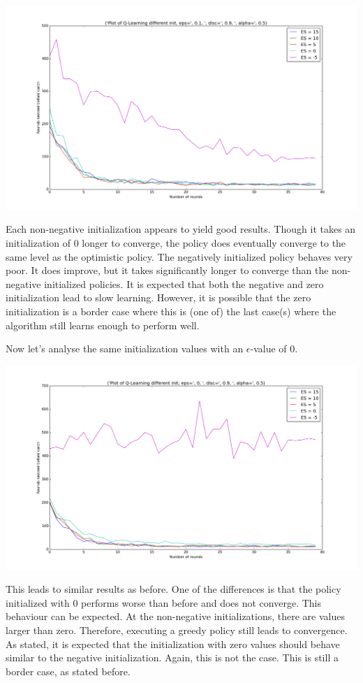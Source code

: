 \documentclass{article}
\begin{document}
\begin{center}
	\includegraphics[scale=0.4]{q_learnin_diff_init_epsilon_0_1}
\end{center}

Each non-negative initialization appears to yield good results. Though it takes an initialization of 0 longer to converge, the policy does eventually converge to the same level as the optimistic policy. The negatively initialized policy behaves very poor. It does improve, but it takes significantly longer to converge than the non-negative initialized policies. It is expected that both the negative and zero initialization lead to slow learning. However, it is possible that the zero initialization is a border case where this is (one of) the last case(s) where the algorithm still learns enough to perform well.

Now let's analyse the same initialization values with an $\epsilon$-value of 0.
\begin{center}
	\includegraphics[scale=0.4]{q_learning_diff_init_epsilon_0}
\end{center}
This leads to similar results as before. One of the differences is that the policy initialized with 0 performs worse than before and does not converge. This behaviour can be expected. At the non-negative initializations, there are values larger than zero. Therefore, executing a greedy policy still leads to convergence. As stated, it is expected that the initialization with zero values should behave similar to the negative initialization. Again, this is not the case. This is still a border case, as stated before.
\end{document}
